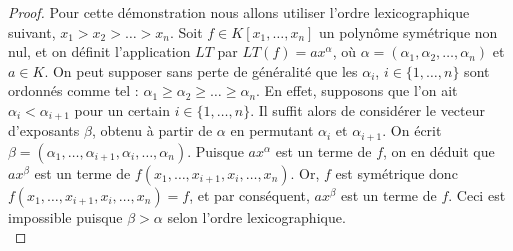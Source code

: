 \documentclass[12pt]{article}
\theoremstyle{remark}\newtheorem{note}{Note}
\theoremstyle{remark}\newtheorem{nota}{Notation}
\theoremstyle{definition}
\begin{document}
\begin{proof}
Pour cette démonstration nous allons utiliser l'ordre lexicographique suivant, $x_1 > x_2 > \ldots > x_n$. Soit $f \in K[x_1, \ldots , x_n]$ un polynôme symétrique non nul, et on définit l'application $LT$ par $LT(f) = ax^{\alpha}$, où $\alpha=(\alpha_1 , \alpha_2, \ldots , \alpha_n )$ et $a \in K$. On peut supposer sans perte de généralité que les $\alpha_i$, $i\in \lbrace 1, \ldots , n \rbrace $ sont ordonnés comme tel : $\alpha_1 \geq \alpha_2 \geq \ldots \geq \alpha_n$.
En effet, supposons que l'on ait $\alpha_i < \alpha_{i+1}$ pour un certain $i\in \lbrace 1, \ldots , n \rbrace $. Il suffit alors de considérer le vecteur d'exposants $\beta$, obtenu à partir de $\alpha$ en permutant $\alpha_i$ et $\alpha_{i+1}$. On écrit $\beta = (\alpha_1 ,\ldots , \alpha_{i+1}, \alpha_i , \ldots , \alpha_n)$. Puisque $ax^{\alpha}$ est un terme de $f$, on en déduit que $ax^{\beta}$ est un terme de $f(x_1 , \ldots , x_{i+1}, x_{i}, \ldots , x_n)$. Or, $f$ est symétrique donc $f(x_1 , \ldots , x_{i+1}, x_{i}, \ldots , x_n)=f$, et par conséquent, $ax^{\beta}$ est un terme de $f$. Ceci est impossible puisque $\beta > \alpha$ selon l'ordre lexicographique.\\


\end{proof}
\end{document}
